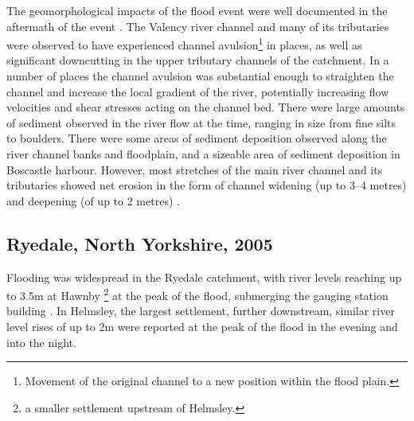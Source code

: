 The geomorphological impacts of the flood event were well documented in the aftermath of the event \citep{wallingford2005flooding}. The Valency river channel and many of its tributaries were observed to have experienced channel avulsion\footnote{Movement of the original channel to a new position within the flood plain.} in places, as well as significant downcutting in the upper tributary channels of the catchment. In a number of places the channel avulsion was substantial enough to straighten the channel and increase the local gradient of the river, potentially increasing flow velocities and shear stresses acting on the channel bed. There were large amounts of sediment observed in the river flow at the time, ranging in size from fine silts to boulders. There were some areas of sediment deposition observed along the river channel banks and floodplain, and a sizeable area of sediment deposition in Boscastle harbour. However, most stretches of the main river channel and its tributaries showed net erosion in the form of channel widening (up to 3--4 metres) and deepening (of up to 2 metres) \citep{wallingford2005flooding}.

\subsection{Ryedale, North Yorkshire, 2005}
Flooding was widespread in the Ryedale catchment, with river levels reaching up to 3.5m at Hawnby \footnote{a smaller settlement upstream of Helmsley.} at the peak of the flood, submerging the gauging station building \citep{wass2008investigation}. In Helmsley, the largest settlement, further downstream, similar river level rises of up to 2m were reported at the peak of the flood in the evening and into the night. 

